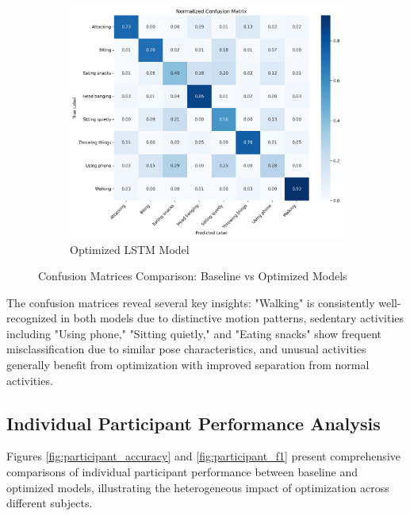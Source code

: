 \documentclass{iopconfser}
\begin{document}
\begin{figure}[H]
\begin{subfigure}{0.7\textwidth}
    \centering
    \includegraphics[width=\textwidth]{results/metrics/optimized/confusion_matrix.png}
    \caption{Optimized LSTM Model}
    \label{fig:optimized_confusion}
\end{subfigure}
\caption{Confusion Matrices Comparison: Baseline vs Optimized Models}
\label{fig:confusion_matrices}
\end{figure}

The confusion matrices reveal several key insights: "Walking" is consistently well-recognized in both models due to distinctive motion patterns, sedentary activities including "Using phone," "Sitting quietly," and "Eating snacks" show frequent misclassification due to similar pose characteristics, and unusual activities generally benefit from optimization with improved separation from normal activities.

\subsection{Individual Participant Performance Analysis}

Figures \ref{fig:participant_accuracy} and \ref{fig:participant_f1} present comprehensive comparisons of individual participant performance between baseline and optimized models, illustrating the heterogeneous impact of optimization across different subjects.
\end{document}
